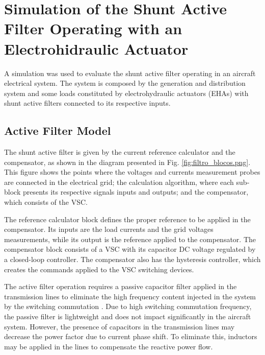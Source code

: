 \section{Simulation of the Shunt Active Filter Operating with an Electrohidraulic Actuator}

A simulation was used to evaluate the shunt active filter operating in an aircraft electrical system. The system is composed by the generation and distribution system and some loads constituted by electrohydraulic actuators (EHAs) with shunt active filters connected to its respective inputs.

\subsection{Active Filter Model}

The shunt active filter is given by the current reference calculator and the compensator, as shown in the diagram presented in Fig. \ref{fig:filtro_blocos.png}. This figure shows the points where the voltages and currents measurement probes are connected in the electrical grid; the calculation algorithm, where each sub-block presents its respective signals inputs and outputs; and the compensator, which consists of the VSC.

The reference calculator block defines the proper reference to be applied in the compensator. Its inputs are the load currents and the grid voltages measurements, while its output is the reference applied to the compensator. The compensator block consists of a VSC with its capacitor DC voltage regulated by a closed-loop controller. The compensator also has the hysteresis controller, which creates the commands applied to the VSC switching devices.

The active filter operation requires a passive capacitor filter applied in the transmission lines to eliminate the high frequency content injected in the system by the switching commutation \citep{Akagi2007}. Due to high switching commutation frequency, the passive filter is lightweight and does not impact significantly in the aircraft system. However, the presence of capacitors in the transmission lines may decrease the power factor due to current phase shift. To eliminate this, inductors may be applied in the lines to compensate the reactive power flow.

